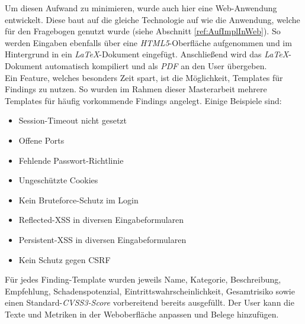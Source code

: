 	Um diesen Aufwand zu minimieren, wurde auch hier eine Web-Anwendung entwickelt. Diese baut auf die gleiche Technologie auf wie die Anwendung, welche für den Fragebogen genutzt wurde (siehe Abschnitt \ref{ref:AufImplInWeb}). So werden Eingaben ebenfalls über eine \textit{HTML5}-Oberfläche aufgenommen und im Hintergrund in ein \textit{LaTeX}-Dokument eingefügt. Anschließend wird das \textit{LaTeX}-Dokument automatisch kompiliert und als \textit{PDF} an den User übergeben.\\
	
	Ein Feature, welches besonders Zeit spart, ist die Möglichkeit, Templates für Findings zu nutzen. So wurden im Rahmen dieser Masterarbeit mehrere Templates für häufig vorkommende Findings angelegt. Einige Beispiele sind:
	\begin{itemize}
		\item Session-Timeout nicht gesetzt
		\item Offene Ports
		\item Fehlende Passwort-Richtlinie
		\item Ungeschützte Cookies
		\item Kein Bruteforce-Schutz im Login
		\item Reflected-XSS in diversen Eingabeformularen
		\item Persistent-XSS in diversen Eingabeformularen
		\item Kein Schutz gegen CSRF
	\end{itemize}
	
	Für jedes Finding-Template wurden jeweils Name, Kategorie, Beschreibung, Empfehlung, Schadenspotenzial, Eintrittswahrscheinlichkeit, Gesamtrisiko sowie einen Standard-\textit{CVSS3-Score} vorbereitend bereits ausgefüllt. Der User kann die Texte und Metriken in der Weboberfläche anpassen und Belege hinzufügen.
	